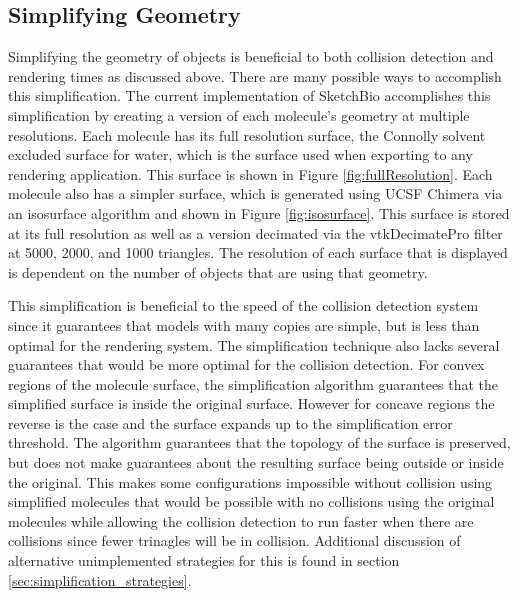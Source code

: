 \documentclass{article} %
\begin{document}
\subsection{Simplifying Geometry}
Simplifying the geometry of objects is beneficial to both collision detection and rendering times as discussed above.  There are many possible ways to accomplish this simplification.  The current implementation of SketchBio accomplishes this simplification by creating a version of each molecule's geometry at multiple resolutions. Each molecule has its full resolution surface, the Connolly solvent excluded surface for water, which is the surface used when exporting to any rendering application. This surface is shown in Figure \ref{fig:fullResolution}. Each molecule also has a simpler surface, which is generated using UCSF Chimera via an isosurface algorithm and shown in Figure \ref{fig:isosurface}. This surface is stored at its full resolution as well as a version decimated via the vtkDecimatePro filter at 5000, 2000, and 1000 triangles.  The resolution of each surface that is displayed is dependent on the number of objects that are using that geometry.

This simplification is beneficial to the speed of the collision detection system since it guarantees that models with many copies are simple, but is less than optimal for the rendering system.  The simplification technique also lacks several guarantees that would be more optimal for the collision detection.  For convex regions of the molecule surface, the simplification algorithm guarantees that the simplified surface is inside the original surface.  However for concave regions the reverse is the case and the surface expands up to the simplification error threshold.  The algorithm guarantees that the topology of the surface is preserved, but does not make guarantees about the resulting surface being outside or inside the original.  This makes some configurations impossible without collision using simplified molecules that would be possible with no collisions using the original molecules while allowing the collision detection to run faster when there are collisions since fewer trinagles will be in collision.  Additional discussion of alternative unimplemented strategies for this is found in section \ref{sec:simplification_strategies}.
\end{document}
